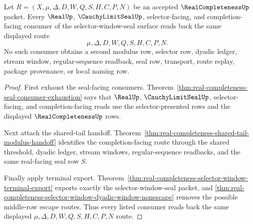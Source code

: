 \begin{theorem}
\label{thm:real-completeness-selector-window-consumer-readback}
Let $R=(X,\mu,\Delta,D,W,Q,S,H,C,P,N)$ be an accepted $\RealCompletenessUp$ packet. Every $\RealUp$, $\CauchyLimitSealUp$, selector-facing, and completion-facing consumer of the selector-window-seal surface reads back the same displayed route
$$
\mu,\Delta,D,W,Q,S,H,C,P,N.
$$
No such consumer obtains a second modulus row, selector row, dyadic ledger, stream window, regular-sequence readback, seal row, transport, route replay, package provenance, or local naming row.
\end{theorem}
\begin{proof}
First exhaust the seal-facing consumers. Theorem~\ref{thm:real-completeness-seal-consumer-exhaustion} says that $\RealUp$, $\CauchyLimitSealUp$, selector-facing, and completion-facing reads use the selector-presented rows and the displayed $\RealCompletenessUp$ rows.

Next attach the shared-tail handoff. Theorem~\ref{thm:real-completeness-shared-tail-modulus-handoff} identifies the completion-facing route through the shared threshold, dyadic ledger, stream windows, regular-sequence readbacks, and the same real-facing seal row $S$.

Finally apply terminal export. Theorem~\ref{thm:real-completeness-selector-window-terminal-export} exports exactly the selector-window-seal packet, and \autoref{thm:real-completeness-selector-window-dyadic-window-nonescape} removes the possible middle-row escape routes. Thus every listed consumer reads back the same displayed $\mu,\Delta,D,W,Q,S,H,C,P,N$ route.
\end{proof}

